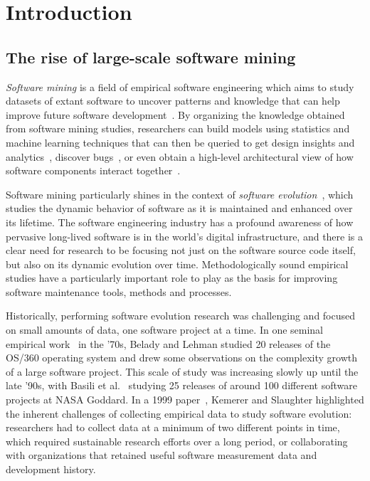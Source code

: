 \chapter{Introduction}


\section{The rise of large-scale software mining}

\emph{Software mining} is a field of empirical software engineering which aims
to study datasets of extant software to uncover patterns and knowledge that can
help improve future software development~\cite{2006-zeller-msr}. By organizing
the knowledge obtained from software mining studies, researchers can build
models using statistics and machine learning techniques that can then be
queried to get design insights and analytics~\cite{hassan2006mining}, discover
bugs~\cite{williams2005automatic,BugRepair2017}, or even obtain a high-level
architectural view of how software components interact
together~\cite{hassan2008road}.

Software mining particularly shines in the context of \emph{software
evolution}~\cite{mens2008swevolintro,kagdi2007msrsurvey}, which studies the
dynamic behavior of software as it is maintained and enhanced over its
lifetime. The software engineering industry has a profound awareness of how
pervasive long-lived software is in the world's digital infrastructure, and
there is a clear need for research to be focusing not just on the software
source code itself, but also on its dynamic evolution over time.
Methodologically sound empirical studies have a particularly important role to
play as the basis for improving software maintenance tools, methods and
processes.

Historically, performing software evolution research was challenging and
focused on small amounts of data, one software project at a time. In one
seminal empirical work~\cite{belady1976model} in the '70s, Belady and Lehman
studied 20 releases of the OS/360 operating system and drew some observations
on the complexity growth of a large software project. This scale of study was
increasing slowly up until the late '90s, with Basili et
al.~\cite{basili1996understanding} studying 25 releases of around 100 different
software projects at NASA Goddard.  In a 1999
paper~\cite{kemerer1999empirical}, Kemerer and Slaughter highlighted the
inherent challenges of collecting empirical data to study software evolution:
researchers had to collect data at a minimum of two different points in time,
which required sustainable research efforts over a long period, or
collaborating with organizations that retained useful software measurement data
and development history.


